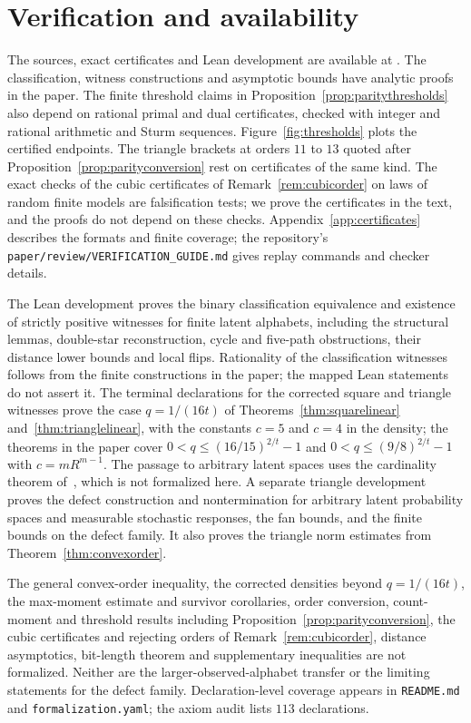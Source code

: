\section{Verification and availability}\label{sec:repro}

The sources, exact certificates and Lean development are available at \repo. The classification, witness constructions and asymptotic bounds have analytic proofs in the paper. The finite threshold claims in Proposition~\ref{prop:paritythresholds} also depend on rational primal and dual certificates, checked with integer and rational arithmetic and Sturm sequences. Figure~\ref{fig:thresholds} plots the certified endpoints. The triangle brackets at orders $11$ to $13$ quoted after Proposition~\ref{prop:parityconversion} rest on certificates of the same kind. The exact checks of the cubic certificates of Remark~\ref{rem:cubicorder} on laws of random finite models are falsification tests; we prove the certificates in the text, and the proofs do not depend on these checks. Appendix~\ref{app:certificates} describes the formats and finite coverage; the repository's \texttt{paper/review/VERIFICATION\_GUIDE.md} gives replay commands and checker details.

The Lean development proves the binary classification equivalence and existence of strictly positive witnesses for finite latent alphabets, including the structural lemmas, double-star reconstruction, cycle and five-path obstructions, their distance lower bounds and local flips. Rationality of the classification witnesses follows from the finite constructions in the paper; the mapped Lean statements do not assert it. The terminal declarations for the corrected square and triangle witnesses prove the case $q=1/(16t)$ of Theorems~\ref{thm:squarelinear} and~\ref{thm:trianglelinear}, with the constants $c=5$ and $c=4$ in the density; the theorems in the paper cover $0<q\le(16/15)^{2/t}-1$ and $0<q\le(9/8)^{2/t}-1$ with $c=mR^{m-1}$. The passage to arbitrary latent spaces uses the cardinality theorem of~\cite{RGW2018}, which is not formalized here. A separate triangle development proves the defect construction and nontermination for arbitrary latent probability spaces and measurable stochastic responses, the fan bounds, and the finite bounds on the defect family. It also proves the triangle norm estimates from Theorem~\ref{thm:convexorder}.

The general convex-order inequality, the corrected densities beyond $q=1/(16t)$, the max-moment estimate and survivor corollaries, order conversion, count-moment and threshold results including Proposition~\ref{prop:parityconversion}, the cubic certificates and rejecting orders of Remark~\ref{rem:cubicorder}, distance asymptotics, bit-length theorem and supplementary inequalities are not formalized. Neither are the larger-observed-alphabet transfer or the limiting statements for the defect family. Declaration-level coverage appears in \texttt{README.md} and \texttt{formalization.yaml}; the axiom audit lists $113$ declarations.

